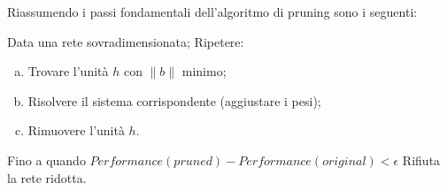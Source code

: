 Riassumendo i passi fondamentali dell'algoritmo di pruning sono i seguenti:
\begin{algorithmic}[1]%
	\State Data una rete sovradimensionata;
	\State Ripetere:
	\begin{enumerate}[(a)]
		\item Trovare l'unità $h$ con $\| b \|$ minimo;
		\item Risolvere il sistema corrispondente (aggiustare i pesi);
		\item Rimuovere l'unità $h$.
	\end{enumerate}
	Fino a quando $Performance(pruned) - Performance(original) < \epsilon$
	\State Rifiuta la rete ridotta.
\end{algorithmic}




















